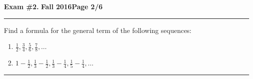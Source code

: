 \documentclass[12pt]{article}
\theoremstyle{definition}
\begin{document}
\hfill{\large\bf Exam \#2.}\hfill{\large\bf
  Fall 2016}\hfill{\large\bf Page 2/6}\hrule

\bigskip
{ Find a formula for the general term of the following sequences:} 
\begin{enumerate}
\item $\displaystyle{\frac{1}{2}, \frac{3}{4}, \frac{5}{6}, \frac{7}{8}, \dotsc}$
\bigskip
\begin{flushright}
\end{flushright}
\item $\displaystyle{1-\frac{1}{2}, \frac{1}{3} - \frac{1}{2}, \frac{1}{3} - \frac{1}{4}, \frac{1}{5}-\frac{1}{4}, \dotsc}$
\vspace{3cm}
\begin{flushright}
\end{flushright}
\end{enumerate}
\hrule
\end{document}
